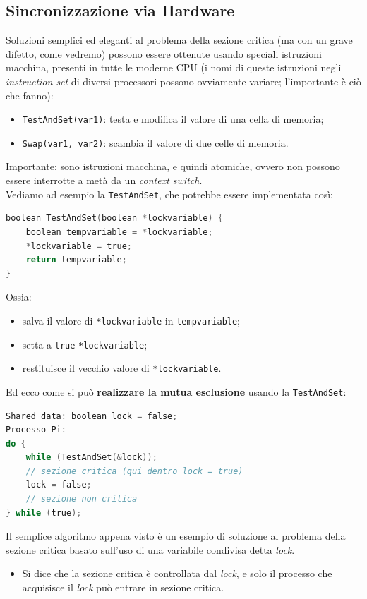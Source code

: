 \subsection{Sincronizzazione via Hardware}
Soluzioni semplici ed eleganti al problema della sezione critica (ma con un grave difetto, come vedremo) possono essere ottenute usando speciali istruzioni macchina, presenti in tutte le moderne CPU (i nomi di queste istruzioni negli \textit{instruction set} di diversi processori possono ovviamente variare; l'importante è ciò che fanno):
\begin{itemize}
    \item \texttt{TestAndSet(var1)}: testa e modifica il valore di una cella di memoria;
    \item \texttt{Swap(var1, var2)}: scambia il valore di due celle di memoria.
\end{itemize}
Importante: sono istruzioni macchina, e quindi atomiche, ovvero non possono essere interrotte a metà da un \textit{context switch}.\\
Vediamo ad esempio la \texttt{TestAndSet}, che potrebbe essere implementata così:
\begin{lstlisting}[language=C]
boolean TestAndSet(boolean *lockvariable) {
    boolean tempvariable = *lockvariable;
    *lockvariable = true;
    return tempvariable;
}
\end{lstlisting}
Ossia:
\begin{itemize}
    \item salva il valore di \texttt{*lockvariable} in \texttt{tempvariable};
    \item setta a \texttt{true} \texttt{*lockvariable};
    \item restituisce il vecchio valore di \texttt{*lockvariable}.
\end{itemize}
Ed ecco come si può \textbf{realizzare la mutua esclusione }usando la \texttt{TestAndSet}:
\begin{lstlisting}[language=C]
Shared data: boolean lock = false;
Processo Pi:
do {
    while (TestAndSet(&lock));
    // sezione critica (qui dentro lock = true)
    lock = false;
    // sezione non critica
} while (true);
\end{lstlisting}
Il semplice algoritmo appena visto è un esempio di soluzione al problema della sezione critica basato sull'uso di una variabile condivisa detta \textit{lock}.
\begin{itemize}
    \item Si dice che la sezione critica è controllata dal \textit{lock}, e solo il processo che acquisisce il \textit{lock} può entrare in sezione critica.
\end{itemize}
